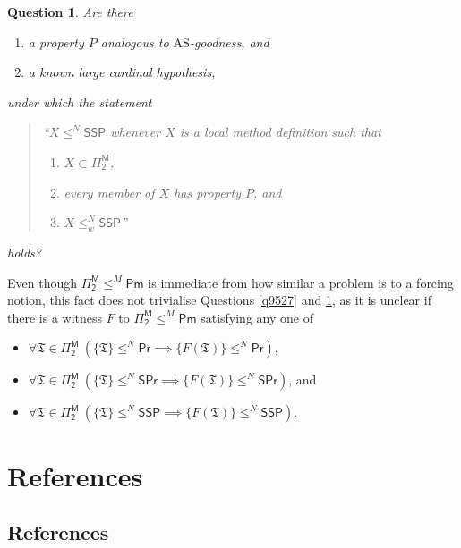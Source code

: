 \documentclass[12pt, twoside]{memoir}
\numberwithin{equation}{section}
\newtheorem{ques}[thm]{Question}
\theoremstyle{definition}
\theoremstyle{remark}
\theoremstyle{definition}
\theoremstyle{definition}
\theoremstyle{definition}
\theoremstyle{remark}
\begin{document}
\begin{ques}\label{q9528}
Are there
\begin{enumerate}[label=(\alph*)]
    \item a property $P$ analogous to $\mathrm{AS}$-goodness, and
    \item a known large cardinal hypothesis,
\end{enumerate} 
under which the statement
\begin{quote}
    ``$X \leq^N \mathsf{SSP}$ whenever $X$ is a local method definition such that
    \begin{enumerate}[label=(\arabic*),leftmargin=40pt]
        \item $X \subset \mathsf{\Pi^M_2}$,
        \item every member of $X$ has property $P$, and
        \item $X \leq^N_w \mathsf{SSP}$''
    \end{enumerate}
\end{quote}
holds?
\end{ques}

Even though $\mathsf{\Pi^M_2} \leq^M \mathsf{Pm}$ is immediate from how similar a problem is to a forcing notion, this fact does not trivialise Questions \ref{q9527} and \ref{q9528}, as it is unclear if there is a witness $F$ to $\mathsf{\Pi^M_2} \leq^M \mathsf{Pm}$ satisfying any one of
\begin{itemize}
    \item $\forall \mathfrak{T} \in \mathsf{\Pi^M_2} \ (\{\mathfrak{T}\} \leq^N \mathsf{Pr} \implies \{F(\mathfrak{T})\} \leq^N \mathsf{Pr})$,
    \item $\forall \mathfrak{T} \in \mathsf{\Pi^M_2} \ (\{\mathfrak{T}\} \leq^N \mathsf{SPr} \implies \{F(\mathfrak{T})\} \leq^N \mathsf{SPr})$, and
    \item $\forall \mathfrak{T} \in \mathsf{\Pi^M_2} \ (\{\mathfrak{T}\} \leq^N \mathsf{SSP} \implies \{F(\mathfrak{T})\} \leq^N \mathsf{SSP})$.
\end{itemize}

\part{\texorpdfstring{ References}{References}}

\chapter{References}
\printbibliography[heading=none]
\end{document}

